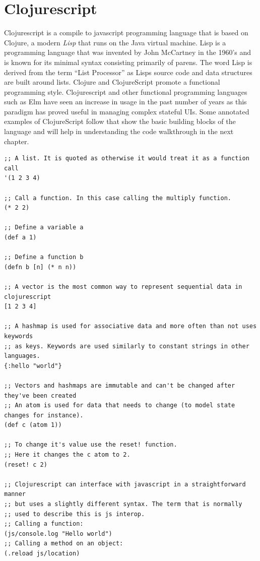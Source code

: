 \documentclass[12pt]{report}
\begin{document}
\section{Clojurescript}
\label{sec:org3a005d7}
Clojurescript is a compile to javascript programming language that is based on
Clojure, a modern \emph{Lisp} that runs on the Java virtual machine. Lisp is a
programming language that was invented by John McCartney in the 1960's and is
known for its minimal syntax consisting primarily of parens. The word Lisp is
derived from the term ``List Processor'' as Lisps source code and data structures
are built around lists. Clojure and ClojureScript promote a functional
programming style. Clojurescript and other functional programming languages such
as Elm have seen an increase in usage in the past number of years as this
paradigm has proved useful in managing complex stateful UIs. Some annotated
examples of ClojureScript follow that show the basic building blocks of the
language and will help in understanding the code walkthrough in the next
chapter.

\begin{footnotesize}
\begin{verbatim}
;; A list. It is quoted as otherwise it would treat it as a function call
'(1 2 3 4)

;; Call a function. In this case calling the multiply function.
(* 2 2)

;; Define a variable a
(def a 1)

;; Define a function b
(defn b [n] (* n n))

;; A vector is the most common way to represent sequential data in clojurescript
[1 2 3 4]

;; A hashmap is used for associative data and more often than not uses keywords
;; as keys. Keywords are used similarly to constant strings in other languages.
{:hello "world"}

;; Vectors and hashmaps are immutable and can't be changed after they've been created
;; An atom is used for data that needs to change (to model state changes for instance).
(def c (atom 1))

;; To change it's value use the reset! function.
;; Here it changes the c atom to 2.
(reset! c 2)

;; Clojurescript can interface with javascript in a straightforward manner
;; but uses a slightly different syntax. The term that is normally
;; used to describe this is js interop.
;; Calling a function:
(js/console.log "Hello world")
;; Calling a method on an object:
(.reload js/location)

\end{verbatim}
\end{footnotesize}
\end{document}
